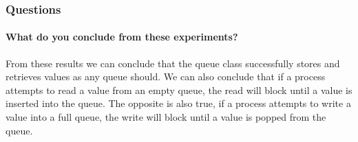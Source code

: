 \subsubsection*{Questions}

\paragraph{What do you conclude from these experiments?}

From these results we can conclude that the queue class successfully stores and retrieves values as any queue should.  We can also conclude that if a process attempts to read a value from an empty queue, the read will block until a value is inserted into the queue.  The opposite is also true, if a process attempts to write a value into a full queue, the write will block until a value is popped from the queue.
